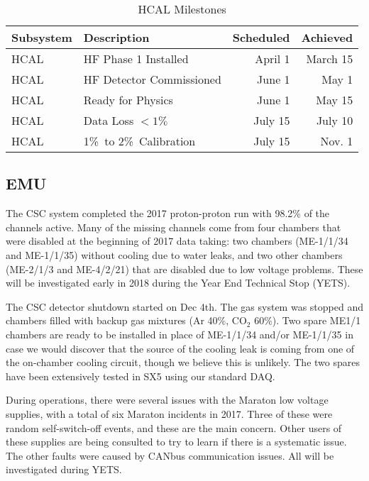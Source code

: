 \documentclass[12pt]{article}
\begin{document}
\begin{table}[htp]
\caption{HCAL Milestones}
\begin{center}
\begin{tabular}{|l|l|r|r|}
\hline
Subsystem&Description&Scheduled&Achieved\\
\hline
HCAL& HF Phase 1 Installed & April 1 &  March 15 \\
\hline
HCAL& HF Detector Commissioned & June 1 & May 1 \\
\hline
HCAL& Ready for Physics & June 1 & May 15\\
\hline
HCAL& Data Loss $<  1\%\ $  & July 15  & July 10\\
\hline
HCAL& 1\%\ to  2\%\  Calibration & July 15   &  Nov. 1 \\
\hline
\end{tabular}
\end{center}
\label{HCALMilestones}
\end{table}%












\subsection{EMU }

The CSC system completed the 2017 proton-proton run with 98.2\% of the 
channels active.  Many of the missing channels come from four chambers that 
were disabled at the beginning of 2017 data taking: two chambers 
(ME-1/1/34 and ME-1/1/35) without cooling due to water leaks, and  
two other chambers (ME-2/1/3 and ME-4/2/21) that are disabled due to low voltage problems. 
These will be investigated early in 2018 during the Year End Technical Stop (YETS).

The CSC detector shutdown started on Dec 4th. The gas system was stopped and chambers filled with backup gas mixtures (Ar 40\%, CO$_2$ 60\%). Two spare ME1/1 chambers are ready to be installed in place of ME-1/1/34 and/or ME-1/1/35 in case we would discover that the source of the cooling leak is coming from one of the on-chamber cooling circuit, though we believe this is unlikely. The two spares have been extensively tested in SX5 using our standard DAQ.

 During operations, there were several issues with the Maraton low voltage
supplies, with a total of six Maraton incidents in 2017.  Three of these were random self-switch-off events, and these are the main concern. Other users 
of these supplies are being consulted to try to learn if there is a systematic 
issue. The other faults were caused by CANbus communication issues. All will be investigated during YETS. 
\end{document}
